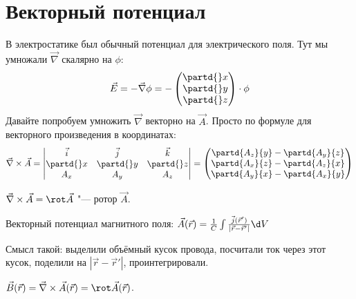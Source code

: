 \section{Векторный потенциал}
	В электростатике был обычный потенциал для электрического поля.
	Тут мы умножали $\vec \nabla$ скалярно на $\phi$:
	\[ \vec E = -\vec \nabla \phi = -\begin{pmatrix}\partd{}x\\\partd{}y\\\partd{}z\end{pmatrix} \cdot \phi\]
	Давайте попробуем умножить $\vec \nabla$ векторно на $\vec A$.
	Просто по формуле для векторного произведения в координатах:
	\[
	\vec \nabla \times \vec A
	=
	\left|\begin{matrix}
	\vec i & \vec j & \vec k \\
	\partd{}x & \partd{}y & \partd{}z \\
	A_x & A_y & A_z \\
	\end{matrix}\right|
	=
	\begin{pmatrix}
		\partd{A_z}{y} - \partd{A_y}{z} \\
		\partd{A_x}{z} - \partd{A_z}{x} \\
		\partd{A_y}{x} - \partd{A_x}{y}
	\end{pmatrix}
	\]
	\begin{Def}
		$\vec \nabla \times \vec A = \rot \vec A$ "--- ротор $\vec A$.
	\end{Def}
	\begin{Def}
		Векторный потенциал магнитного поля:
		$\vec A(\vec r) = \frac 1 C \int \frac{\vec j(\vec r')}{|\vec r - \vec r'|} \d V$
	\end{Def}
	Смысл такой: выделили объёмный кусок провода, посчитали ток через этот кусок, поделили на $|\vec r - \vec r'|$, проинтегрировали.
	\begin{theorem}
		$\vec B(\vec r) = \vec \nabla \times \vec A(\vec r) = \rot \vec A(\vec r)$.
	\end{theorem}
